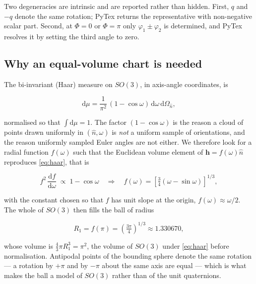 Two degeneracies are intrinsic and are reported rather than hidden. First, \(q\) and \(-q\)
denote the same rotation; PyTex returns the representative with non-negative scalar part.
Second, at \(\Phi = 0\) or \(\Phi = \pi\) only \(\varphi_1 \pm \varphi_2\) is determined, and
PyTex resolves it by setting the third angle to zero.

\subsection{Why an equal-volume chart is needed}

The bi-invariant (Haar) measure on \(SO(3)\), in axis-angle coordinates, is

\begin{equation}
  \mathrm{d}\mu = \frac{1}{\pi^{2}}\,(1 - \cos\omega)\,\mathrm{d}\omega\,\mathrm{d}\Omega_{\hat{n}},
  \label{eq:haar}
\end{equation}

normalised so that \(\int \mathrm{d}\mu = 1\). The factor \((1-\cos\omega)\) is the reason a
cloud of points drawn uniformly in \((\hat{n}, \omega)\) is \emph{not} a uniform sample of
orientations, and the reason uniformly sampled Euler angles are not either. We therefore look
for a radial function \(f(\omega)\) such that the Euclidean volume element of
\(\mathbf{h} = f(\omega)\hat{n}\) reproduces \eqref{eq:haar}, that is

\begin{equation}
  f^{2}\,\frac{\mathrm{d}f}{\mathrm{d}\omega} \;\propto\; 1 - \cos\omega
  \quad\Longrightarrow\quad
  f(\omega) = \left[\tfrac{3}{4}\left(\omega - \sin\omega\right)\right]^{1/3},
\end{equation}

with the constant chosen so that \(f\) has unit slope at the origin, \(f(\omega) \approx
\omega/2\). The whole of \(SO(3)\) then fills the ball of radius

\begin{equation}
  R_{1} = f(\pi) = \left(\tfrac{3\pi}{4}\right)^{1/3} \approx 1.330670,
\end{equation}

whose volume is \(\tfrac{4}{3}\pi R_{1}^{3} = \pi^{2}\), the volume of \(SO(3)\) under
\eqref{eq:haar} before normalisation. Antipodal points of the bounding sphere denote the same
rotation --- a rotation by \(+\pi\) and by \(-\pi\) about the same axis are equal --- which is
what makes the ball a model of \(SO(3)\) rather than of the unit quaternions.

